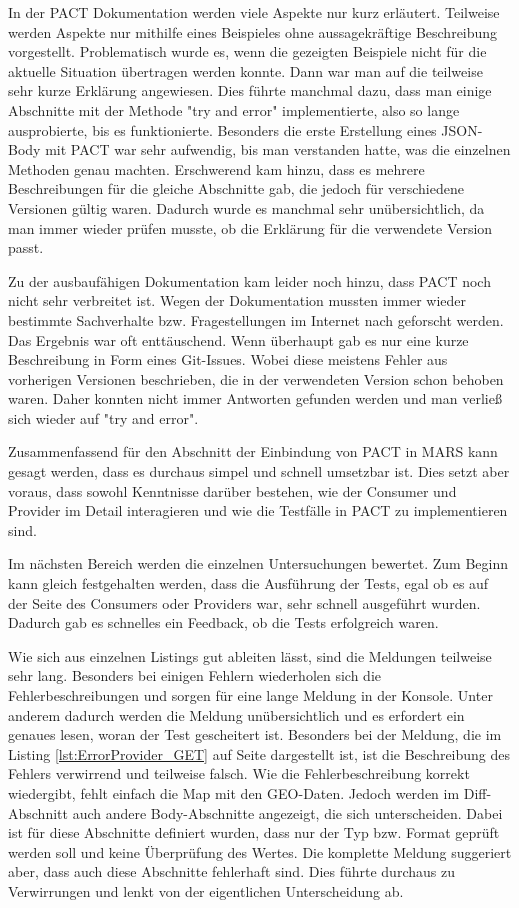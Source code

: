 \documentclass{llncs}
\begin{document}
In der PACT Dokumentation werden viele Aspekte nur kurz erläutert. Teilweise werden Aspekte nur mithilfe eines Beispieles ohne aussagekräftige Beschreibung vorgestellt. Problematisch wurde es, wenn die gezeigten Beispiele nicht für die aktuelle Situation übertragen werden konnte. Dann war man auf die teilweise sehr kurze Erklärung angewiesen. Dies führte manchmal dazu, dass man einige Abschnitte mit der Methode "try and error" implementierte, also so lange ausprobierte, bis es funktionierte. Besonders die erste Erstellung eines JSON-Body mit PACT war sehr aufwendig, bis man verstanden hatte, was die einzelnen Methoden genau machten. Erschwerend kam hinzu, dass es mehrere Beschreibungen für die gleiche Abschnitte gab, die jedoch für verschiedene Versionen gültig waren. Dadurch wurde es manchmal sehr unübersichtlich, da man immer wieder prüfen musste, ob die Erklärung für die verwendete Version passt.

Zu der ausbaufähigen Dokumentation kam leider noch hinzu, dass PACT noch nicht sehr verbreitet ist. Wegen der Dokumentation mussten immer wieder bestimmte Sachverhalte bzw. Fragestellungen im Internet nach geforscht werden. Das Ergebnis war oft enttäuschend. Wenn überhaupt gab es nur eine kurze Beschreibung in Form eines Git-Issues. Wobei diese meistens Fehler aus vorherigen Versionen beschrieben, die in der verwendeten Version schon behoben waren. Daher konnten nicht immer Antworten gefunden werden und man verließ sich wieder auf "try and error".

Zusammenfassend für den Abschnitt der Einbindung von PACT in MARS kann gesagt werden, dass es durchaus simpel und schnell umsetzbar ist. Dies setzt aber voraus, dass sowohl Kenntnisse darüber bestehen, wie der Consumer und Provider im Detail interagieren und wie die Testfälle in PACT zu implementieren sind.

Im nächsten Bereich werden die einzelnen Untersuchungen bewertet. Zum Beginn kann gleich festgehalten werden, dass die Ausführung der Tests, egal ob es auf der Seite des Consumers oder Providers war, sehr schnell ausgeführt wurden. Dadurch gab es schnelles ein Feedback, ob die Tests erfolgreich waren. 

Wie sich aus einzelnen Listings gut ableiten lässt, sind die Meldungen teilweise sehr lang. Besonders bei einigen Fehlern wiederholen sich die Fehlerbeschreibungen und sorgen für eine lange Meldung in der Konsole. Unter anderem dadurch werden die Meldung unübersichtlich und es erfordert ein genaues lesen, woran der Test gescheitert ist. Besonders bei der Meldung, die im Listing \ref{lst:ErrorProvider_GET} auf Seite \pageref{lst:ErrorProvider_GET} dargestellt ist, ist die Beschreibung des Fehlers verwirrend und teilweise falsch. Wie die Fehlerbeschreibung korrekt wiedergibt, fehlt einfach die Map mit den GEO-Daten. Jedoch werden im Diff-Abschnitt auch andere Body-Abschnitte angezeigt, die sich unterscheiden. Dabei ist für diese Abschnitte definiert wurden, dass nur der Typ bzw. Format geprüft werden soll und keine Überprüfung des Wertes. Die komplette Meldung suggeriert aber, dass auch diese Abschnitte fehlerhaft sind. Dies führte durchaus zu Verwirrungen und lenkt von der eigentlichen Unterscheidung ab. 
 
\end{document}
